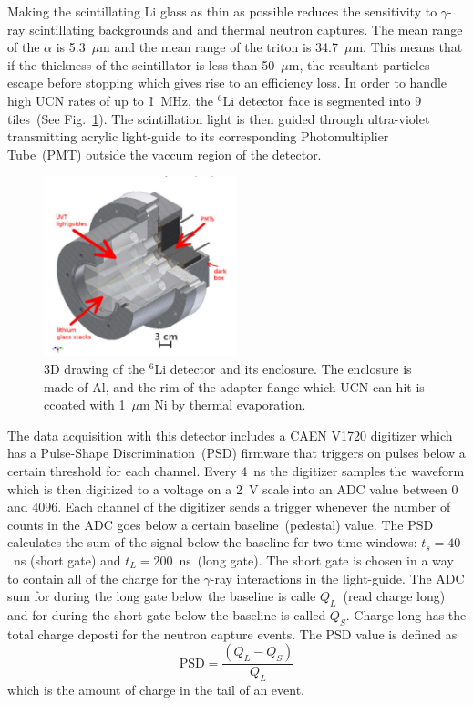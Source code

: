 Making the scintillating Li glass as thin as possible reduces the
sensitivity to $\gamma$-ray scintillating backgrounds and and thermal
neutron captures. The mean range of the $\alpha$ is 5.3~$\mu$m and the
mean range of the triton is 34.7~$\mu$m. This means that if the
thickness of the scintillator is less than 50~$\mu$m, the resultant
particles escape before stopping which gives rise to an efficiency
loss.  In order to handle high UCN rates of up to \~1~MHz, the
$^6\mathrm{Li}$ detector face is segmented into 9 tiles~(See
Fig.~\ref{fig:Li6detector}). The scintillation light is then guided
through ultra-violet transmitting acrylic light-guide to its
corresponding Photomultiplier Tube~(PMT) outside the vaccum region of
the detector.

\begin{figure}[h]
  \centering
  \includegraphics[width=0.5\textwidth]{Li6detector.png}
  \caption{3D drawing of the $^6$Li detector and its enclosure. The
    enclosure is made of Al, and the rim of the adapter flange which
    UCN can hit is ccoated with 1~$\mu$m Ni by thermal evaporation. }
  \label{fig:Li6detector}
\end{figure}

The data acquisition with this detector includes a CAEN V1720
digitizer which has a Pulse-Shape Discrimination~(PSD) firmware that
triggers on pulses below a certain threshold for each channel. Every
4~ns the digitizer samples the waveform which is then digitized to a
voltage on a 2~V scale into an ADC value between 0 and 4096. Each
channel of the digitizer sends a trigger whenever the number of counts
in the ADC goes below a certain baseline~(pedestal) value. The PSD
calculates the sum of the signal below the baseline for two time
windows: $t_s = 40$~ns (short gate) and $t_L = 200$~ns~(long
gate). The short gate is chosen in a way to contain all of the charge
for the $\gamma$-ray interactions in the light-guide. The ADC sum for
during the long gate below the baseline is calle $Q_L$~(read charge
long) and for during the short gate below the baseline is called
$Q_S$. Charge long has the total charge deposti for the neutron
capture events. The PSD value is defined as
\begin{equation}
  \label{eq:psd}
  \mathrm{PSD} = \frac{\left( Q_L - Q_S\right)}{Q_L}
\end{equation}  
which is the amount of charge in the tail of an event.

